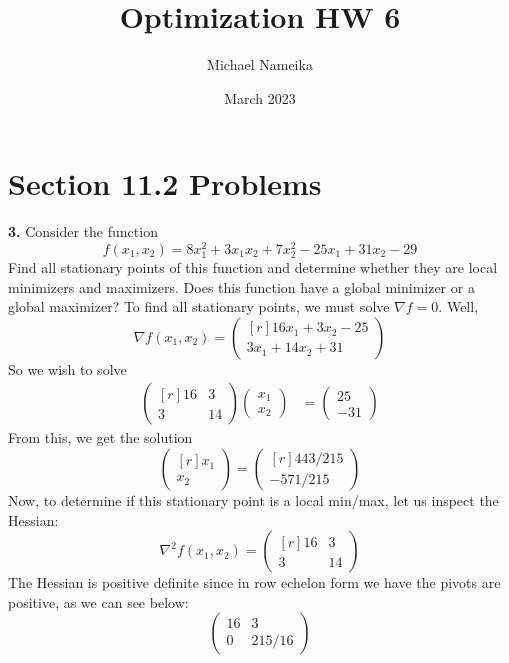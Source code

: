 \documentclass{article}
\title{Optimization HW 6}
\author{Michael Nameika}
\date{March 2023}
\begin{document}
\maketitle

\section*{Section 11.2 Problems}
\textbf{3.} 
Consider the function
\[f(x_1,x_2) = 8x_1^2 + 3x_1x_2 + 7x_2^2 - 25x_1 + 31x_2 - 29\]
Find all stationary points of this function and determine whether they are local minimizers and maximizers. Does this function have a global minimizer or a global maximizer?
\newline\newline
To find all stationary points, we must solve $\nabla f = 0$. Well,
\[\nabla f(x_1,x_2) = \begin{pmatrix*}[r]
    16x_1 + 3x_2 - 25\\
    3x_1 + 14x_2 + 31
\end{pmatrix*}\]
So we wish to solve 
\begin{align*}
    \begin{pmatrix*}[r]
        16 & 3\\
        3 & 14
    \end{pmatrix*}\begin{pmatrix*}
        x_1\\
        x_2
    \end{pmatrix*}
     &= \begin{pmatrix*}
         25\\
         -31
     \end{pmatrix*}
\end{align*}    
From this, we get the solution
\[\begin{pmatrix*}[r]
    x_1\\
    x_2
\end{pmatrix*} = \begin{pmatrix*}[r]
    443/215\\
    -571/215
\end{pmatrix*}\]
Now, to determine if this stationary point is a local min/max, let us inspect the Hessian:
\[\nabla^2f(x_1,x_2) = \begin{pmatrix*}[r]
    16 & 3\\
    3 & 14
\end{pmatrix*}\]
The Hessian is positive definite since in row echelon form we have the pivots are positive, as we can see below:
\[\begin{pmatrix*}
    16 & 3\\
    0 & 215/16
\end{pmatrix*}\]
\end{document}
